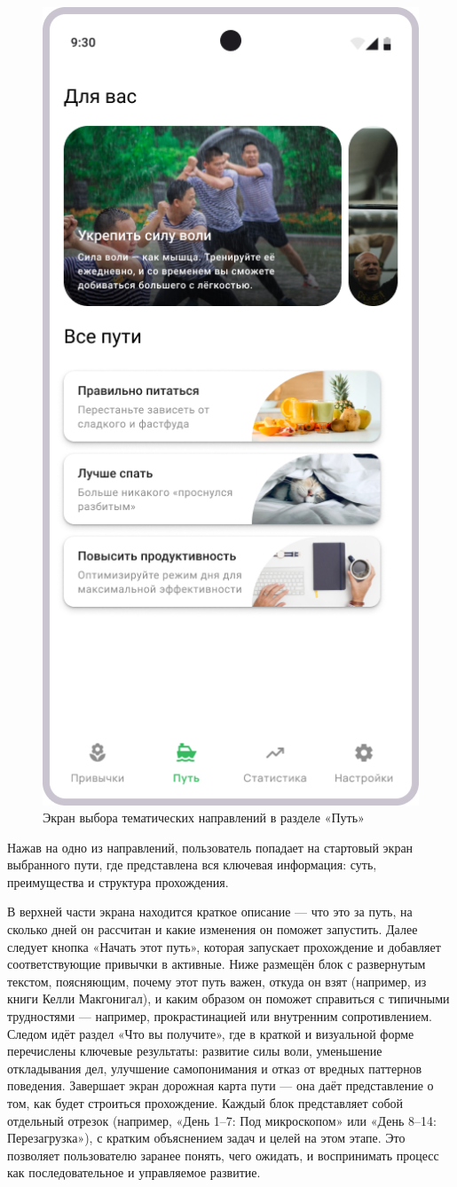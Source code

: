\documentclass[pdflatex,sn-mathphys-num]{sn-jnl}%
\theoremstyle{thmstyleone}%
\theoremstyle{thmstyletwo}%
\theoremstyle{thmstylethree}%
\begin{document}
\begin{figure}
    \centering
    \includegraphics[width=0.5\linewidth]{figures/App/Journey.png}
    \caption{Экран выбора тематических направлений в разделе «Путь»}
    \label{fig:Journey}
\end{figure}

Нажав на одно из направлений, пользователь попадает на стартовый экран выбранного пути, где представлена вся ключевая информация: суть, преимущества и структура прохождения.

В верхней части экрана находится краткое описание — что это за путь, на сколько дней он рассчитан и какие изменения он поможет запустить. Далее следует кнопка «Начать этот путь», которая запускает прохождение и добавляет соответствующие привычки в активные. Ниже размещён блок с развернутым текстом, поясняющим, почему этот путь важен, откуда он взят (например, из книги Келли Макгонигал), и каким образом он поможет справиться с типичными трудностями — например, прокрастинацией или внутренним сопротивлением. Следом идёт раздел «Что вы получите», где в краткой и визуальной форме перечислены ключевые результаты: развитие силы воли, уменьшение откладывания дел, улучшение самопонимания и отказ от вредных паттернов поведения. Завершает экран дорожная карта пути — она даёт представление о том, как будет строиться прохождение. Каждый блок представляет собой отдельный отрезок (например, «День 1–7: Под микроскопом» или «День 8–14: Перезагрузка»), с кратким объяснением задач и целей на этом этапе. Это позволяет пользователю заранее понять, чего ожидать, и воспринимать процесс как последовательное и управляемое развитие.
\end{document}
